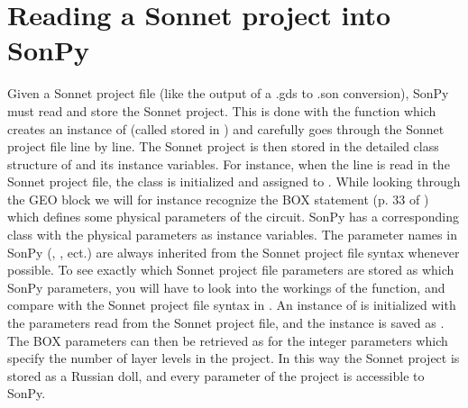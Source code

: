 \documentclass[letterpaper,10pt,english,openany]{sphinxmanual}
\begin{document}
\section{Reading a Sonnet project into SonPy}
\label{\detokenize{source/dev_guide:reading-a-sonnet-project-into-sonpy}}
Given a Sonnet project file (like the output of a .gds to .son conversion), SonPy must read and store the Sonnet project. This is done with the function  which creates an instance of  (called  stored in ) and carefully goes through the Sonnet project file line by line. The Sonnet project is then stored in the detailed class structure of  and its instance variables. For instance, when the line  is read in the Sonnet project file, the class  is initialized and assigned to . While looking through the GEO block we will for instance recognize the BOX statement (p. 33 of \label{\detokenize{source/dev_guide:id5}}{\hyperref[\detokenize{source/users_guide:son15}]{\sphinxcrossref{{[}Son15{]}}}}) which defines some physical parameters of the circuit. SonPy has a corresponding  class with the physical parameters as instance variables. The parameter names in SonPy (, ,  ect.) are always inherited from the Sonnet project file syntax whenever possible. To see exactly which Sonnet project file parameters are stored as which SonPy parameters, you will have to look into the workings of the  function, and compare with the Sonnet project file syntax in \label{\detokenize{source/dev_guide:id6}}{\hyperref[\detokenize{source/users_guide:son15}]{\sphinxcrossref{{[}Son15{]}}}}. An instance of  is initialized with the parameters read from the Sonnet project file, and the  instance is saved as . The BOX parameters can then be retrieved as  for the integer parameters  which specify the number of layer levels in the project. In this way the Sonnet project is stored as a Russian doll, and every parameter of the project is accessible to SonPy.
\end{document}
